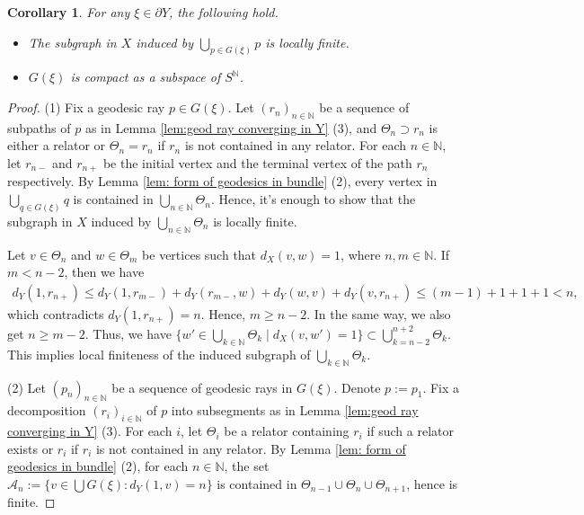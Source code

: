 \documentclass{article}[11pt]
\newtheorem{cor}[thm]{Corollary}
\newcommand{\N}{\mathbb{N}}
\begin{document}
{{\color{black} \begin{cor}\label{cor:G(xi) is compact}
    For any $\xi \in \partial Y$, the following hold.
    \begin{itemize}
        \item[(1)]
        The subgraph in $X$ induced by $\bigcup_{p \in G(\xi)}p$ is locally finite.
        \item[(2)] 
        $G(\xi)$ is compact as a subspace of $S^{\N}$.
    \end{itemize}
\end{cor}

\begin{proof}
    (1)
    Fix a geodesic ray $p \in G(\xi)$. Let $(r_n)_{n \in \N}$ be a sequence of subpaths of $p$ as in Lemma \ref{lem:geod ray converging in Y} (3), and $\Theta_n \supset r_n$ is either a relator or $\Theta_n = r_n$ if $r_n$ is not contained in any relator. For each $n \in \N$, let $r_{n-}$ and $r_{n+}$ be the initial vertex and the terminal vertex of the path $r_n$ respectively. By Lemma \ref{lem: form of geodesics in bundle} (2), every vertex in $\bigcup_{q \in G(\xi)}q$ is contained in $\bigcup_{n \in \N} \Theta_n$. Hence, it's enough to show that the subgraph in $X$ induced by $\bigcup_{n \in \N} \Theta_n$ is locally finite.

    Let $v \in \Theta_n$ and $w \in \Theta_m$ be vertices such that $d_X(v,w)=1$, where $n,m \in \N$. If $m < n-2$, then we have
    \begin{align*}
        d_Y(1,r_{n+}) \le d_Y(1,r_{m-}) + d_Y(r_{m-},w) + d_Y(w,v) + d_Y(v,r_{n+})\le (m-1)+1+1+1<n,
    \end{align*}
    which contradicts $d_Y(1,r_{n+})=n$. Hence, $m \ge n-2$. In the same way, we also get $n \ge m-2$. Thus, we have $\{w' \in \bigcup_{k \in \N} \Theta_k \mid d_X(v,w')=1\} \subset \bigcup_{k = n-2}^{n+2} \Theta_k$. This implies local finiteness of the induced subgraph of $\bigcup_{k \in \N} \Theta_k$.

    (2)
     Let $(p_n)_{n \in \N}$ be a sequence of geodesic rays in $G(\xi)$. Denote $p := p_1$. Fix a decomposition $(r_i)_{i \in \N}$ of $p$ into subsegments as in Lemma \ref{lem:geod ray converging in Y} (3). For each $i$, let $\Theta_i$ be a relator containing $r_i$ if such a relator exists or $r_i$ if $r_i$ is not contained in any relator. By Lemma \ref{lem: form of geodesics in bundle} (2), for each $n \in \N$, the set $\mathcal{A}_n := \{v \in \bigcup G(\xi): d_Y(1,v) = n\}$ is contained in $\Theta_{n-1} \cup \Theta_n \cup \Theta_{n+1}$, hence is finite. 


\end{proof}}}
\end{document}
